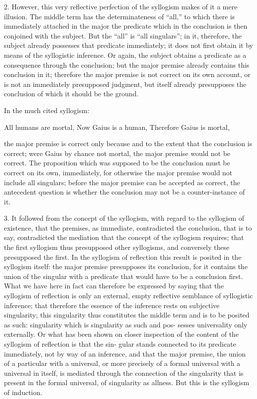 2. However, this very reflective perfection
of the syllogism makes of it a mere illusion.
The middle term has the determinateness of “all,”
to which there is immediately attached in the major
the predicate which in the conclusion is
then conjoined with the subject.
But the “all” is “all singulars”;
in it, therefore, the subject already possesses
that predicate immediately;
it does not first obtain it
by means of the syllogistic inference.
Or again, the subject obtains a predicate as
a consequence through the conclusion;
but the major premise already contains this conclusion in it;
therefore the major premise is not correct on its own account,
or is not an immediately presupposed judgment,
but itself already presupposes the conclusion
of which it should be the ground.

In the much cited syllogism:

All humans are mortal,
Now Gaius is a human,
Therefore Gaius is mortal,

the major premise is correct only because
and to the extent that the conclusion is correct;
were Gaius by chance not mortal,
the major premise would not be correct.
The proposition which was supposed to be the conclusion
must be correct on its own, immediately,
for otherwise the major premise would not include all singulars;
before the major premise can be accepted as correct,
the antecedent question is whether the conclusion
may not be a counter-instance of it.

3. It followed from the concept of the syllogism,
with regard to the syllogism of existence,
that the premises, as immediate, contradicted the conclusion,
that is to say, contradicted the mediation
that the concept of the syllogism requires;
that the first syllogism thus presupposed other syllogisms,
and conversely these presupposed the first.
In the syllogism of reflection this result
is posited in the syllogism itself:
the major premise presupposes its conclusion,
for it contains the union of the singular with a
predicate that would have to be a conclusion first.
What we have here in fact can therefore be expressed by saying that
the syllogism of reflection is only an external,
empty reflective semblance of syllogistic inference;
that therefore the essence of the inference rests on
subjective singularity;
this singularity thus constitutes the middle term and
is to be posited as such:
singularity which is singularity as such and pos-
sesses universality only externally.
Or what has been shown on closer
inspection of the content of the syllogism of reflection is that the sin-
gular stands connected to its predicate immediately,
not by way of an inference,
and that the major premise,
the union of a particular with a universal,
or more precisely of a formal universal with a universal in itself,
is mediated through the connection of the singularity
that is present in the formal universal,
of singularity as allness.
But this is the syllogism of induction.

